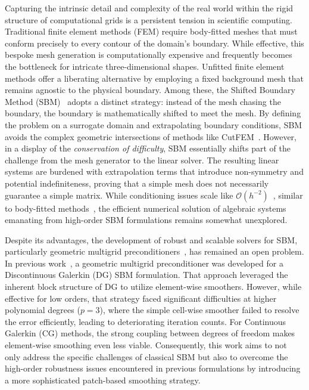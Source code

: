 \documentclass{elsarticle}
\begin{document}
Capturing the intrinsic detail and complexity of the real world within the rigid structure of computational grids is a
persistent tension in scientific computing. Traditional finite element methods (FEM) require body-fitted meshes that
must conform precisely to every contour of the domain's boundary. While effective, this bespoke mesh generation is
computationally expensive and frequently becomes the bottleneck for intricate three-dimensional shapes. Unfitted finite
element methods offer a liberating alternative by employing a fixed background mesh that remains agnostic to the
physical boundary. Among these, the Shifted Boundary Method (SBM)~\cite{main2018shifted} adopts a distinct strategy:
instead of the mesh chasing the boundary, the boundary is mathematically shifted to meet the mesh. By defining the
problem on a surrogate domain and extrapolating boundary conditions, SBM avoids the complex geometric intersections of
methods like CutFEM~\cite{burman2015cutfem}. However, in a display of the \emph{conservation of difficulty}, SBM
essentially shifts part of the challenge from the mesh generator to the linear solver. The resulting linear systems are
burdened with extrapolation terms that introduce non-symmetry and potential indefiniteness, proving that a simple mesh
does not necessarily guarantee a simple matrix. While conditioning issues scale like
$\mathcal{O}(h^{-2})$~\cite{atallah2021shifted}, similar to body-fitted methods~\cite{collins2023penalty}, the
efficient numerical solution of algebraic systems emanating from high-order SBM formulations remains somewhat
unexplored.

Despite its advantages, the development of robust and scalable solvers for SBM, particularly geometric multigrid
preconditioners~\cite{hackbusch1985multi}, has remained an open problem. In previous
work~\cite{wichrowski2025geometric}, a geometric multigrid preconditioner was developed for a Discontinuous Galerkin
(DG) SBM formulation. That approach leveraged the inherent block structure of DG to utilize element-wise smoothers.
However, while effective for low orders, that strategy faced significant difficulties at higher polynomial degrees
($p=3$), where the simple cell-wise smoother failed to resolve the error efficiently, leading to deteriorating
iteration counts. For Continuous Galerkin (CG) methods, the strong coupling between degrees of freedom makes
element-wise smoothing even less viable. Consequently, this work aims to not only address the specific challenges of
classical SBM but also to overcome the high-order robustness issues encountered in previous formulations by introducing
a more sophisticated patch-based smoothing strategy.
\end{document}
